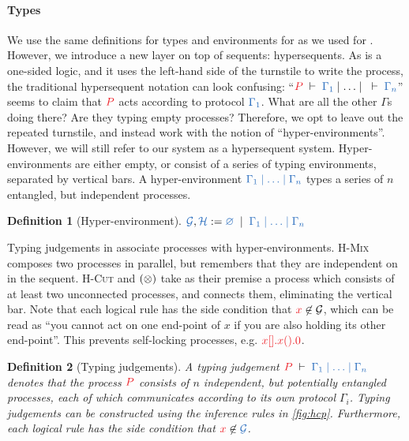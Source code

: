 \documentclass[draft,submission,copyright,creativecommons]{eptcs}
\makeatletter
\newtheorem{definition}{Definition}
\renewcommand*{\eg}{e.g.\@\xspace}
\makeatother
\begin{document}
\paragraph{Types}
We use the same definitions for types and environments for \hcp as we used for \cp.
However, we introduce a new layer on top of sequents: hypersequents.
As \cp is a one-sided logic, and it uses the left-hand side of the
turnstile to write the process, the traditional hypersequent notation can look
confusing: ``$\seq[P]{\Gamma_1}\hsep\dots\hsep\seq{\Gamma_n}$'' seems to claim
that $\tm{P}$ acts according to protocol $\ty{\Gamma_1}$.
What are all the other $\Gamma$s doing there? Are they typing empty processes?
Therefore, we opt to leave out the repeated turnstile, and instead work with the
notion of ``hyper-environments''. However, we will still refer to our system as a
hypersequent system.
Hyper-environments are either empty, or consist of a series of typing
environments, separated by vertical bars.
A hyper-environment $\ty{\Gamma_1 \hsep \dots \hsep \Gamma_n}$ types a series of
$n$ entangled, but independent processes.
\begin{definition}[Hyper-environment]\label{def:hcp-hyper-environment}
  \(
  \ty{\mathcal{G}}, \ty{\mathcal{H}} :=
  \ty{\emptyhypercontext}
  \; \mid \;
  \ty{\Gamma_1 \hsep \dots \hsep \Gamma_n}
  \)
\end{definition}\noindent
Typing judgements in \hcp associate processes with hyper-environments.
\textsc{H-Mix} composes two processes in parallel, but remembers that they are
independent on in the sequent.
\textsc{H-Cut} and $(\otimes)$ take as their premise a process which consists of
at least two unconnected processes, and connects them, eliminating the vertical
bar.
Note that each logical rule has the side condition that $\tm{x} \not\in
\mathcal{G}$, which can be read as ``you cannot act on one end-point of $x$ if
you are also holding its other end-point''.
This prevents self-locking processes, \eg
$\tm{\piBoundSend{x}{}{\piRecv{x}{}{\piHalt}}}$.
\begin{definition}[Typing judgements]\label{def:hcp}
  A typing judgement $\seq[P]{\Gamma_1 \hsep \dots \hsep \Gamma_n}$ denotes
  that the process $\tm{P}$ consists of $n$ independent, but potentially
  entangled processes, each of which communicates according to its own
  protocol $\Gamma_i$.
  Typing judgements can be constructed using the inference rules in \cref{fig:hcp}.
  Furthermore, each logical rule has the side condition that $\tm{x} \not\in
  \ty{\mathcal{G}}$.
\end{definition}\noindent
\end{document}
